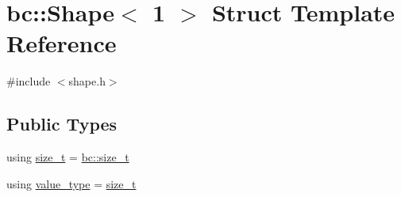 \hypertarget{structbc_1_1Shape_3_011_01_4}{}\section{bc\+:\+:Shape$<$ 1 $>$ Struct Template Reference}
\label{structbc_1_1Shape_3_011_01_4}


{\ttfamily \#include $<$shape.\+h$>$}

\subsection*{Public Types}
\begin{DoxyCompactItemize}
\item 
using \hyperlink{structbc_1_1Shape_3_011_01_4_a7ab1c3926651c49d726655dbaa5dc0a3}{size\+\_\+t} = \hyperlink{namespacebc_aaf8e3fbf99b04b1b57c4f80c6f55d3c5}{bc\+::size\+\_\+t}
\item 
using \hyperlink{structbc_1_1Shape_3_011_01_4_af66534aceeff2fe3a7114d6ee031065a}{value\+\_\+type} = \hyperlink{structbc_1_1Shape_3_011_01_4_a7ab1c3926651c49d726655dbaa5dc0a3}{size\+\_\+t}
\end{DoxyCompactItemize}
